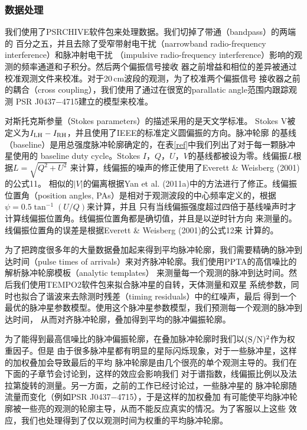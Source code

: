 \subsubsection{数据处理}

我们使用了PSRCHIVE软件包来处理数据\supercite{Hotan04}。我们切掉了带通（bandpass）的两端的
百分之五，并且去除了受窄带射电干扰（narrowband radio-frequency interference）和脉冲射电干扰
（impulsive radio-frequency interference）影响的观测的频率通道和子积分。然后两个偏振信号接收
器之前增益和相位的差异被通过校准观测文件来校准。对于20\,cm波段的观测，为了校准两个偏振信号
接收器之前的耦合（cross coupling），我们使用了通过在很宽的parallatic angle范围内跟踪观测
PSR J0437$-$4715建立的模型来校准\supercite{VanStraten04}。

对斯托克斯参量（Stokes parameters）的描述采用的是天文学标准\supercite{VanStraten10}。
Stokes V被定义为$I_{\rm{LH}}-I_{\rm{RH}}$，并且使用了IEEE的标准定义圆偏振的方向。脉冲轮廓
的基线（baseline）是用总强度脉冲轮廓确定的，在表\ref{ref}中我们列出了对于每一颗脉冲星使用的
baseline duty cycle。Stokes $I$，$Q$，$U$，$V$的基线都被设为零。线偏振$L$根据$L=\sqrt{Q^2+U^2}$
来计算，线偏振的噪声的修正使用了Everett \& Weisberg (2001)\supercite{Everett01}的公式11。
相似的$|V|$的偏离根据Yan et al. (2011a)\supercite{Yan11a}中的方法进行了修正。线偏振位置角（position 
angles, PAs）是相对于观测波段的中心频率定义的，根据$\psi=0.5\tan^{-1}(U/Q)$来计算，并且
只有当线偏振强度超过四倍于基线噪声时才计算线偏振位置角。线偏振位置角都是确切值，并且是以逆时针方向
来测量的。线偏振位置角的误差是根据Everett \& Weisberg (2001)\supercite{Everett01}的公式12来
计算的。

为了把跨度很多年的大量数据叠加起来得到平均脉冲轮廓，我们需要精确的脉冲到达时间（pulse times 
of arrivals）来对齐脉冲轮廓。我们使用PPTA的高信噪比的解析脉冲轮廓模板（analytic templates）
来测量每一个观测的脉冲到达时间。然后我们使用TEMPO2软件包来拟合脉冲星的自转，天体测量和双星
系统参数，同时也拟合了谐波来去除测时残差（timing residuals）中的红噪声\supercite{Hobbs06}，最后
得到一个最优的脉冲星参数模型。使用这个脉冲星参数模型，我们预测每一个观测的脉冲到达时间，
从而对齐脉冲轮廓，叠加得到平均的脉冲偏振轮廓。

为了能得到最高信噪比的脉冲偏振轮廓，在叠加脉冲轮廓时我们以$(\rm{S/N})^2$作为权重因子。但是
由于很多脉冲星都有明显的星际闪烁现象，对于一些脉冲星，这样的加权叠加会导致最后的平均
脉冲轮廓是由几个很亮的单个观测主导的。我们在下面的子章节会讨论到，这样的效应会影响我们
对于谱指数，线偏振比例以及法拉第旋转的测量。另一方面，之前的工作已经讨论过，一些脉冲星的
脉冲轮廓随流量而变化（例如PSR J0437$-$4715）\supercite{Oslowski14}，于是这样的加权叠加
有可能使平均脉冲轮廓被一些亮的观测的轮廓主导，从而不能反应真实的情况。为了客服以上这些
效应，我们也处理得到了仅以观测时间为权重的平均脉冲轮廓。

